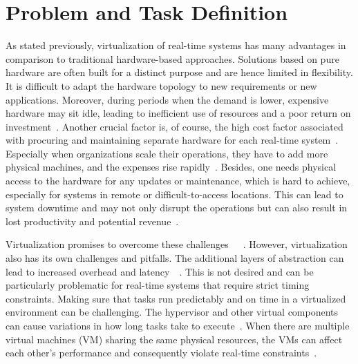 \documentclass[MMR,Master,english]{style/twbook}
\begin{document}
\section{Problem and Task Definition}
As stated previously, virtualization of real-time systems has many advantages in comparison to traditional hardware-based approaches. Solutions based on pure hardware are often built for a distinct purpose and are hence limited in flexibility. It is difficult to adapt the hardware topology to new requirements or new applications. Moreover, during periods when the demand is lower, expensive hardware may sit idle, leading to inefficient use of resources and a poor return on investment~\cite{gabrielResourceAwareParameterTuning2019}. Another crucial factor is, of course, the high cost factor associated with procuring and maintaining separate hardware for each real-time system~\cite{bhardwajVirtualizationCloudComputing2021}. Especially when organizations scale their operations, they have to add more physical machines, and the expenses rise rapidly~\cite{abbasiExploringOpenStackScalable2023}. Besides, one needs physical access to the hardware for any updates or maintenance, which is hard to achieve, especially for systems in remote or difficult-to-access locations. This can lead to system downtime and may not only disrupt the operations but can also result in lost productivity and potential revenue~\cite{mahfoudRealTimePredictiveMaintenanceBased2024}.

\bigskip \noindent Virtualization promises to overcome these challenges~\cite{queirozContainerbasedVirtualizationRealtime2024}~\cite{bhardwajVirtualizationCloudComputing2021}~\cite{cinqueEvaluatingVirtualizationFog2023}. However, virtualization also has its own challenges and pitfalls. The additional layers of abstraction can lead to increased overhead and latency~\cite{casiniLatencyAnalysisVirtualization2021}~\cite{zhangEvaluatingOptimizingVirtualization2010}. This is not desired and can be particularly problematic for real-time systems that require strict timing constraints. Making sure that tasks run predictably and on time in a virtualized environment can be challenging. The hypervisor and other virtual components can cause variations in how long tasks take to execute~\cite{garcia-vallsChallengesRealtimeVirtualization2014}. When there are multiple virtual machines (VM) sharing the same physical resources, the VMs can affect each other's performance and consequently violate real-time constraints~\cite{queirozContainerbasedVirtualizationRealtime2024}.
\end{document}
